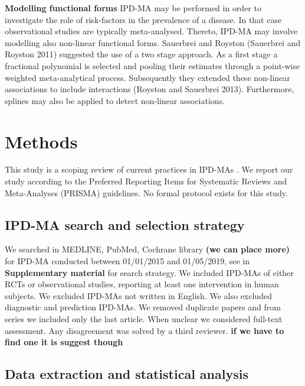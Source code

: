 \documentclass[]{article}
\begin{document}
\textbf{Modelling functional forms} IPD-MA may be performed in order to
investigate the role of risk-factors in the prevalence of a disease. In
that case observational studies are typically meta-analysed. Thereto,
IPD-MA may involve modelling also non-linear functional forms. Sauerbrei
and Royston (Sauerbrei and Royston 2011) suggested the use of a two
stage approach. As a first stage a fractional polynomial is selected and
pooling their estimates through a point-wise weighted meta-analytical
process. Subsequently they extended these non-linear associations to
include interactions (Royston and Sauerbrei 2013). Furthermore, splines
may also be applied to detect non-linear associations.

\newpage

\hypertarget{methods-1}{%
\section{Methods}\label{methods-1}}

This study is a scoping review of current practices in IPD-MAs . We
report our study according to the Preferred Reporting Items for
Systematic Reviews and Meta-Analyses (PRISMA) guidelines. No formal
protocol exists for this study.

\hypertarget{ipd-ma-search-and-selection-strategy}{%
\subsection{IPD-MA search and selection
strategy}\label{ipd-ma-search-and-selection-strategy}}

We searched in MEDLINE, PubMed, Cochrane library \textbf{(we can place
more)} for IPD-MA conducted between 01/01/2015 and 01/05/2019, see in
\textbf{Supplementary material} for search strategy. We included IPD-MAs
of either RCTs or observational studies, reporting at least one
intervention in human subjects. We excluded IPD-MAs not written in
English. We also excluded diagnostic and prediction IPD-MAs. We removed
duplicate papers and from series we included only the last article. When
unclear we considered full-text assessment. Any disagreement was solved
by a third reviewer. \textbf{if we have to find one it is suggest
though}

\hypertarget{data-extraction-and-statistical-analysis}{%
\subsection{Data extraction and statistical
analysis}\label{data-extraction-and-statistical-analysis}}
\end{document}
